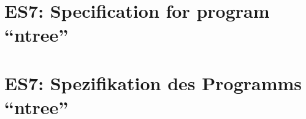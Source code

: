 \parindent0pt

\thispagestyle{empty}
\ifenglish
\section*{ES7: Specification for program ``ntree''}

\fi
\ifgerman
\section*{ES7: Spezifikation des Programms ``ntree''}

\fi


